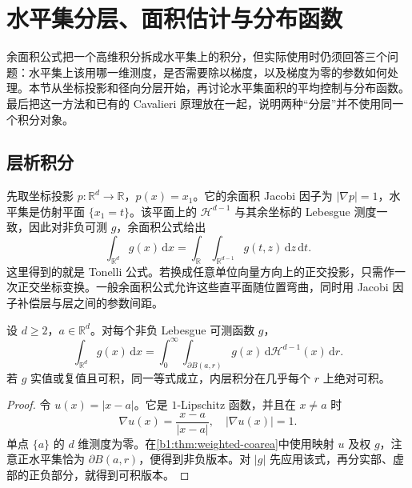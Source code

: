 \section{水平集分层、面积估计与分布函数}
\label{b1:sec:1803}

余面积公式把一个高维积分拆成水平集上的积分，但实际使用时仍须回答三个问题：水平集上该用哪一维测度，是否需要除以梯度，以及梯度为零的参数如何处理。本节从坐标投影和径向分层开始，再讨论水平集面积的平均控制与分布函数。最后把这一方法和已有的 Cavalieri 原理放在一起，说明两种“分层”并不使用同一个积分对象。


\subsection{层析积分}
\label{b1:subsec:180301}

先取坐标投影 \(p:\mathbb R^d\to\mathbb R\)，\(p(x)=x_1\)。它的余面积 Jacobi 因子为 \(|\nabla p|=1\)，水平集是仿射平面 \(\{x_1=t\}\)。该平面上的 \(\mathcal H^{d-1}\) 与其余坐标的 Lebesgue 测度一致，因此对非负可测 \(g\)，余面积公式给出
\[
 \int_{\mathbb R^d}g(x)\,\mathrm dx
 =\int_{\mathbb R}\int_{\mathbb R^{d-1}}
        g(t,z)\,\mathrm dz\,\mathrm dt.
\]
这里得到的就是 Tonelli 公式。若换成任意单位向量方向上的正交投影，只需作一次正交坐标变换。一般余面积公式允许这些直平面随位置弯曲，同时用 Jacobi 因子补偿层与层之间的参数间距。

\begin{proposition}\label{b1:prop:radial-shell-integration}
设 \(d\geq2\)，\(a\in\mathbb R^d\)。对每个非负 Lebesgue 可测函数 \(g\)，
\[
 \int_{\mathbb R^d}g(x)\,\mathrm dx
 =\int_0^\infty\int_{\partial B(a,r)}g(x)\,
       \mathrm d\mathcal H^{d-1}(x)\,\mathrm dr.
\]
若 \(g\) 实值或复值且可积，同一等式成立，内层积分在几乎每个 \(r\) 上绝对可积。
\end{proposition}
\begin{proof}
令 \(u(x)=|x-a|\)。它是 \(1\)-Lipschitz 函数，并且在 \(x\ne a\) 时
\[
 \nabla u(x)=\frac{x-a}{|x-a|},\quad |\nabla u(x)|=1.
\]
单点 \(\{a\}\) 的 \(d\) 维测度为零。在\cref{b1:thm:weighted-coarea}中使用映射 \(u\) 及权 \(g\)，注意正水平集恰为 \(\partial B(a,r)\)，便得到非负版本。对 \(|g|\) 先应用该式，再分实部、虚部的正负部分，就得到可积版本。
\end{proof}

